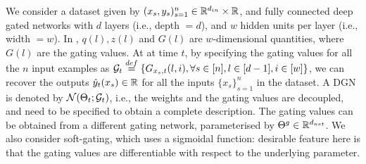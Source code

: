 We consider a dataset given by $(x_s,y_s)_{s=1}^n\in \mathbb{R}^{d_{in}}\times \mathbb{R}$, and fully connected deep gated networks with $d$ layers (i.e., depth $=d$), and $w$ hidden units per layer (i.e., width $=w$). In , $q(l),z(l)$ and $G(l)$ are $w$-dimensional quantities, where $G(l)$ are the gating values.  At at time $t$, by specifying the gating values for all the $n$ input examples as $\mathcal{G}_t\stackrel{def}=\{G_{x_{s},t}(l,i), \forall s\in[n],l\in[d-1],i\in[w]\}$, we can recover the outputs $\hat{y}_t(x_s)\in \mathbb{R}$ for all the inputs $\{x_s\}_{s=1}^n$ in the dataset.  A DGN is denoted by $\mathcal{N}(\Theta_t;\mathcal{G}_t)$, i.e., the weights and the gating values are decoupled, and need to be specified to obtain a complete description. The gating values can be obtained from a different gating network, parameterised by ${\Theta}^g\in\mathbb{R}^{d_{net}}$. We also consider soft-gating, which uses a sigmoidal function: desirable feature here is that the gating values are differentiable with respect to the underlying parameter.
